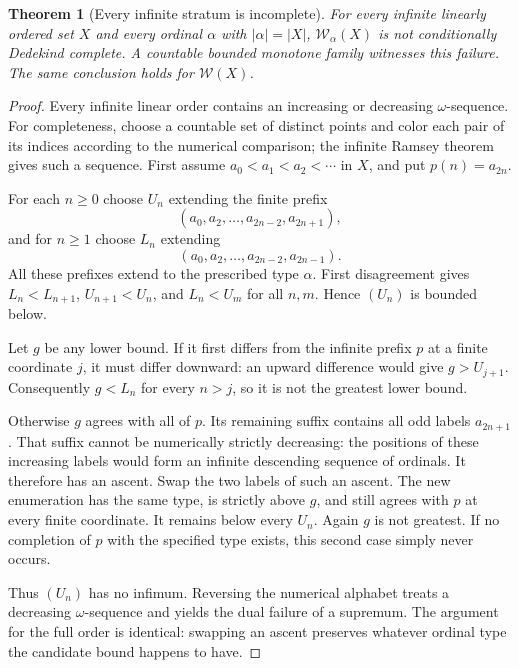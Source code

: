 \documentclass[11pt]{article}
\newtheorem{theorem}{Theorem}[section]
\theoremstyle{definition}
\theoremstyle{remark}
\newcommand{\WO}{\mathcal W}
\begin{document}
\begin{theorem}[Every infinite stratum is incomplete]\label{swo:ds:thm:incomplete}
For every infinite linearly ordered set $X$ and every ordinal $\alpha$
with $|\alpha|=|X|$, $\WO_\alpha(X)$ is not conditionally Dedekind
complete. A countable bounded monotone family witnesses this failure.
The same conclusion holds for $\WO(X)$.
\end{theorem}
\begin{proof}
Every infinite linear order contains an increasing or decreasing
$\omega$-sequence. For completeness, choose a countable set of distinct
points and color each pair of its indices according to the numerical
comparison; the infinite Ramsey theorem gives such a sequence.
First assume $a_0<a_1<a_2<\cdots$ in $X$, and put $p(n)=a_{2n}$.

For each $n\ge0$ choose $U_n$ extending the finite prefix
\[
 (a_0,a_2,\ldots,a_{2n-2},a_{2n+1}),
\]
and for $n\ge1$ choose $L_n$ extending
\[
 (a_0,a_2,\ldots,a_{2n-2},a_{2n-1}).
\]
All these prefixes extend to the prescribed type $\alpha$. First
disagreement gives $L_n<L_{n+1}$, $U_{n+1}<U_n$, and $L_n<U_m$ for
all $n,m$. Hence $(U_n)$ is bounded below.

Let $g$ be any lower bound. If it first differs from the infinite prefix
$p$ at a finite coordinate $j$, it must differ downward: an upward
difference would give $g>U_{j+1}$. Consequently $g<L_n$ for every
$n>j$, so it is not the greatest lower bound.

Otherwise $g$ agrees with all of $p$. Its remaining suffix contains all
odd labels $a_{2n+1}$. That suffix cannot be numerically strictly
decreasing: the positions of these increasing labels would form an
infinite descending sequence of ordinals. It therefore has an ascent.
Swap the two labels of such an ascent. The new enumeration has the same
type, is strictly above $g$, and still agrees with $p$ at every finite
coordinate. It remains below every $U_n$. Again $g$ is not greatest.
If no completion of $p$ with the specified type exists, this second case
simply never occurs.

Thus $(U_n)$ has no infimum. Reversing the numerical alphabet treats a
decreasing $\omega$-sequence and yields the dual failure of a supremum.
The argument for the full order is identical: swapping an ascent preserves
whatever ordinal type the candidate bound happens to have.
\end{proof}
\end{document}
